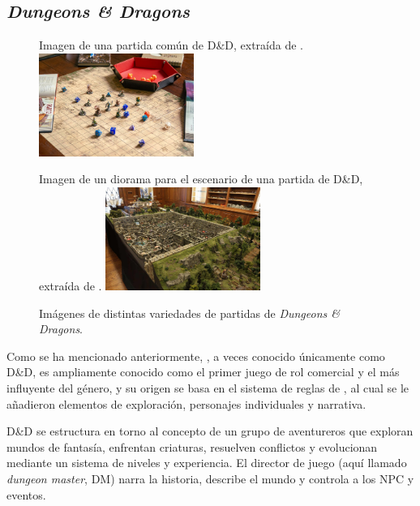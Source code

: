 \subsection{\textit{Dungeons \& Dragons}}
\begin{figure}[t]
\centering
\begin{SubFloat}
{\label{fig:dndsencillo}%
	Imagen de una partida común de D\&D, extraída de \cite{dndsencillaimg}.}%
	\includegraphics[width=0.45\textwidth]{Imagenes/Bitmap/dndsencillo}%
\end{SubFloat}
\qquad
\begin{SubFloat}
{\label{fig:dnddiorama}%
	Imagen de un diorama para el escenario de una partida de D\&D, extraída de \cite{dnddioramaimg}.}%
	\includegraphics[width=0.45\textwidth]{Imagenes/Bitmap/dnddiorama}%
\end{SubFloat}
\caption{Imágenes de distintas variedades de partidas de \textit{Dungeons \& Dragons}. \label{fig:dndejemplos}}
\end{figure}

Como se ha mencionado anteriormente, \cite{ogdnd}, a veces conocido únicamente como D\&D, es ampliamente conocido como el primer juego de rol comercial y el más influyente del género, y su origen se basa en el sistema de reglas de \cite{chainmail}, al cual se le añadieron elementos de exploración, personajes individuales y narrativa.

\medskip

D\&D se estructura en torno al concepto de un grupo de aventureros que exploran mundos de fantasía, enfrentan criaturas, resuelven conflictos y evolucionan mediante un sistema de niveles y experiencia. El director de juego (aquí llamado \textit{dungeon master}, DM) narra la historia, describe el mundo y controla a los NPC y eventos.

